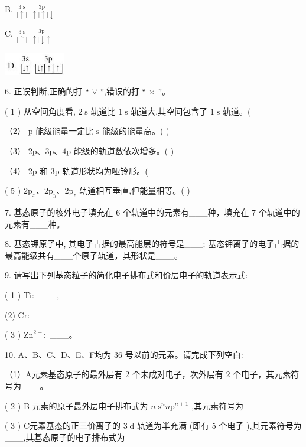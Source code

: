 \documentclass[10pt]{article}
\begin{document}
B. \(\frac{3\mathrm{\;s}}{\lfloor \uparrow \rfloor }\frac{3\mathrm{p}}{\lfloor \uparrow \rceil \uparrow \rfloor \downarrow }\)

C. \(\frac{3\mathrm{\;s}}{\lfloor \uparrow \rfloor }\frac{3\mathrm{p}}{\lfloor \uparrow \mid \downarrow \uparrow \rceil }\)

\begin{center}
\includegraphics[max width=0.2\textwidth]{images/0190e026-5a11-7df7-bd27-54d09026ba7a_20_758173.jpg}
\end{center}

6. 正误判断,正确的打 “ \(\vee\) ”,错误的打 “ \(\times\) ”。

( 1 ) 从空间角度看, \(2\mathrm{\;s}\) 轨道比 \(1\mathrm{\;s}\) 轨道大,其空间包含了 \(1\mathrm{\;s}\) 轨道。(

（2） \(\mathrm{p}\) 能级能量一定比 \(\mathrm{s}\) 能级的能量高。( )

（3） \(2\mathrm{p}\text{、}3\mathrm{p}\text{、}4\mathrm{p}\) 能级的轨道数依次增多。( )

（4） \(2\mathrm{p}\) 和 \(3\mathrm{p}\) 轨道形状均为哑铃形。(

( 5 ) \(2{\mathrm{p}}_{x}\text{、}2{\mathrm{p}}_{y}\text{、}2{\mathrm{p}}_{z}\) 轨道相互垂直,但能量相等。( )

7. 基态原子的核外电子填充在 6 个轨道中的元素有\_\_\_种，填充在 7 个轨道中的元素有\_\_\_种。

8. 基态钾原子中, 其电子占据的最高能层的符号是\_\_\_; 基态钾离子的电子占据的最高能级共有\_\_\_个原子轨道，其形状是\_\_\_。

9. 请写出下列基态粒子的简化电子排布式和价层电子的轨道表示式:

( 1 ) \(\mathrm{{Ti}} :\) \_\_\_,

(2) \(\mathrm{{Cr}} :\)

( 3 ) \({\mathrm{{Zn}}}^{2 + } :\) \_\_\_。

10. A、B、C、D、E、F均为 36 号以前的元素。请完成下列空白:

（1）A元素基态原子的最外层有 2 个未成对电子，次外层有 2 个电子，其元素符号为\_\_\_。

( 2 ) B 元素的原子最外层电子排布式为 \(n{\mathrm{\;s}}^{n}n{\mathrm{p}}^{n + 1}\) ,其元素符号为

( 3 ) C元素基态的正三价离子的 \(3\mathrm{\;d}\) 轨道为半充满 (即有 5 个电子 ),其元素符号为\_\_\_,其基态原子的电子排布式为
\end{document}
